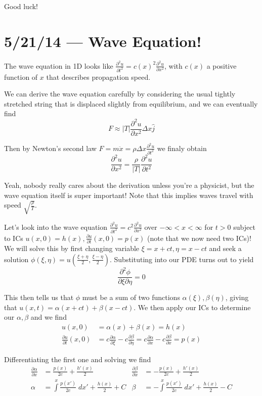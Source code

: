 \documentclass[10pt]{report}
\newcommand{\ptd}[2]{\frac{\partial^2 #1}{\partial#2^2}}
\newcommand{\pd}[2]{\frac{\partial #1}{\partial#2}}
\newcommand{\abs}[1]{\left|#1\right|}
\begin{document}
Good luck!
\chapter{5/21/14 --- Wave Equation!}

The wave equation in 1D looks like $\ptd{u}{t} = c(x)^2 \ptd{u}{x}$, with $c(x)$ a positive function of $x$ that describes propagation speed.

We can derive the wave equation carefully by considering the usual tightly stretched string that is displaced slightly from equilibrium, and we can eventually find
\begin{equation}
    F \approx \abs{T}\ptd{u}{x}\Delta x \hat{j}
\end{equation}

Then by Newton's second law $F = m\ddot{x} = \rho \Delta x \ptd{u}{t}$ we finaly obtain
\begin{equation}
    \ptd{u}{x} = \frac{\rho}{\abs{T}}\ptd{u}{t}
\end{equation}

Yeah, nobody really cares about the derivation unless you're a physicist, but the wave equation itself is super important! Note that this implies waves travel with speed $\sqrt{\frac{\rho}{T}}$. 

Let's look into the wave equation $\ptd{u}{t} = c^2 \ptd{u}{x}$ over $-\infty < x < \infty$ for $t > 0$ subject to ICs $u(x,0) = h(x), \pd{u}{t}(x,0) = p(x)$ (note that we now need two ICs)! We will solve this by first changing variable $\xi = x + ct, \eta = x - ct$ and seek a solution $\phi(\xi, \eta) = u\left(\frac{\xi + \eta}{2}, \frac{\xi - \eta}{2}\right)$. Substituting into our PDE turns out to yield
\begin{equation}
    \frac{\partial^2 \phi}{\partial \xi \partial \eta} = 0
\end{equation}

This then tells us that $\phi$ must be a sum of two functions $\alpha(\xi),\beta(\eta)$, giving that $u(x,t) = \alpha(x + ct) + \beta(x - ct)$. We then apply our ICs to determine our $\alpha, \beta$ and we find
\begin{align}
    u(x,0) &= \alpha(x) + \beta(x) = h(x)\\
    \pd{u}{t}(x,0) &= c\pd{\alpha}{\xi} - c\pd{\beta}{\eta} = c\pd{\alpha}{x} - c\pd{\beta}{x}= p(x)
\end{align}

Differentiating the first one and solving we find
\begin{align}
    \pd{\alpha}{x} &= \frac{p(x)}{2c} + \frac{h'(x)}{2} & \pd{\beta}{x} &= -\frac{p(x)}{2c} + \frac{h'(x)}{2}\\
    \alpha &= \int\limits_{}^{x}\frac{p(x')}{2c}\;dx' + \frac{h(x)}{2} + C & \beta &= -\int\limits_{}^{x}\frac{p(x')}{2c}\;dx' + \frac{h(x)}{2} - C
\end{align}
\end{document}
